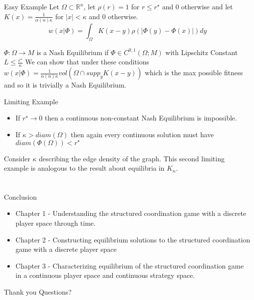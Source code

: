 \documentclass{beamer}
\begin{document}
\begin{frame}{Easy Example}
	Let $\Omega \subset \mathbb{R}^n$, let $\rho(r)=1$ for $r\leq r^\star$ and $0$ otherwise and let $K(x)=\frac{1}{\alpha(n)\kappa}$ for $|x|<\kappa$ and $0$ otherwise. 
	\begin{equation}
		w(x|\Phi)=\int_\Omega K(x-y)\rho(|\Phi(y)-\Phi(x)|)dy
	\end{equation} 

	\begin{block}{$\Phi:\Omega\to M$ is a Nash Equilibrium if $\Phi\in C^{0,1}(\Omega;M)$ with Lipschitz Constant $L\leq \frac{r^\star}{\kappa}$}
		We can show that under these conditions $w(x|\Phi)=\frac{1}{\alpha(n)\kappa} vol(\Omega\cap supp_y K(x-y))$ which is the max possible fitness and so it is trivially a Nash Equilibrium. 
	\end{block}
\end{frame}

\begin{frame}{Limiting Example}
	\begin{itemize}
		\item If $r^\star\rightarrow0$ then a continuous non-constant Nash Equilibrium is impossible.
		
		\item If $\kappa > diam(\Omega)$ then again every continuous solution must have $diam (\Phi(\Omega))<r^\star$
	\end{itemize}
	Consider $\kappa$ describing the edge density of the graph. This second limiting example is analogous to the result about equilibria in $K_n$.
	 
\end{frame}

\section*{}
\begin{frame}{Conclusion}
	\begin{itemize}
		\item Chapter 1 - Understanding the structured coordination game with a discrete player space through time. 
		\item Chapter 2 - Constructing equilibrium solutions to the structured coordination game with a discrete player space
		\item Chapter 3 - Characterizing equilibrium of the structured coordination game in a continuous player space and continuous strategy space. 
	\end{itemize}
\end{frame} 

\begin{frame}{Thank you}
	\centering
	\Large Questions?
\end{frame}
\end{document}
